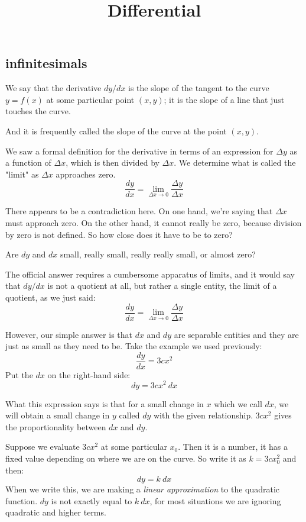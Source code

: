 \documentclass[11pt, oneside]{article}
\title{Differential}
\date{}
\begin{document}
\maketitle
\Large


\subsection*{infinitesimals}
We say that the derivative $dy/dx$ is the slope of the tangent to the curve $y = f(x)$ at some particular point $(x,y)$;  it is the slope of a line that just touches the curve.

And it is frequently called the slope of the curve at the point $(x,y)$.

We saw a formal definition for the derivative in terms of an expression for $\Delta y$ as a function of $\Delta x$, which is then divided by $\Delta x$.  We determine what is called the "limit" as $\Delta x$ approaches zero.
\[ \frac{dy}{dx} = \lim_{\Delta x \rightarrow 0} \frac{\Delta y}{\Delta x} \]

There appears to be a contradiction here.  On one hand, we're saying that $\Delta x$ must approach zero.  On the other hand, it cannot really be zero, because division by zero is not defined.  So how close does it have to be to zero?  

Are $dy$ and $dx$ small, really small, really really small, or almost zero?  

The official answer requires a cumbersome apparatus of limits, and it would say that $dy/dx$ is not a quotient at all, but rather a single entity, the limit of a quotient, as we just said:
\[ \frac{dy}{dx} = \lim_{\Delta x \rightarrow 0} \frac{\Delta y}{\Delta x} \]

However, our simple answer is that $dx$ and $dy$ are separable entities and they are just as small as they need to be.  Take the example we used previously:
 \[ \frac{dy}{dx} = 3cx^2 \]
Put the $dx$ on the right-hand side:
\[ dy = 3cx^2 \ dx \]

What this expression says is that for a small change in $x$ which we call $dx$, we will obtain a small change in $y$ called $dy$ with the given relationship.  $3cx^2$ gives the proportionality between $dx$ and $dy$.

Suppose we evaluate $3cx^2$ at some particular $x_0$.  Then it is a number, it has a fixed value depending on where we are on the curve.  So write it as $k = 3cx_0^2$ and then:
\[ dy = k \ dx \]
When we write this, we are making a \emph{linear approximation} to the quadratic function.  $dy$ is not exactly equal to $k \ dx$, for most situations we are ignoring quadratic and higher terms.
\end{document}
